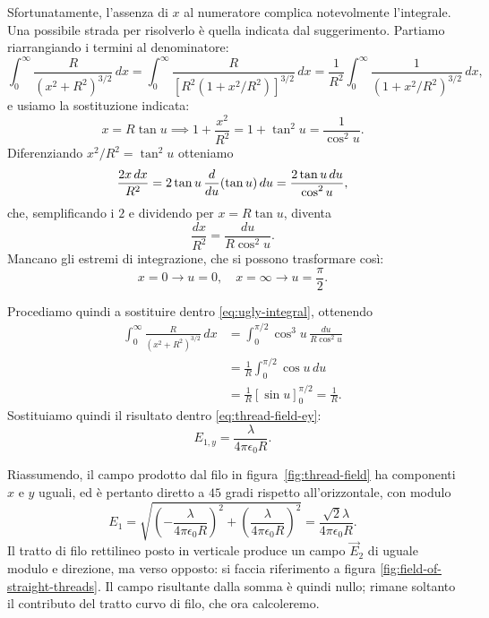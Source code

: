 \documentclass[10pt]{gulartcl}
\begin{document}
\begin{solution}
Sfortunatamente, l’assenza di $x$ al numeratore complica notevolmente
l’integrale. Una possibile strada per risolverlo è quella indicata dal
suggerimento. Partiamo riarrangiando i termini al denominatore:
\begin{equation}
    \int_{0}^{\infty} \frac{R}{(x^{2} + R^{2})^{3/2}} \, dx =
    \int_{0}^{\infty} \frac{R}{[R^2(1 + x^2 / R^2)]^{3/2}}\, dx =
    \frac{1}{R^2} \int_{0}^{\infty} \frac{1}{(1 + x^{2} / R^{2})^{3/2}}\,
    dx,
    \label{eq:ugly-integral}
\end{equation}
e usiamo la sostituzione indicata:
\begin{equation}
    x = R \tan u \implies 1 + \frac{x^{2}}{R^{2}} = 1 + \tan^2 u =
    \frac{1}{\cos^2 u}.
\end{equation}
Diferenziando $x^2 / R^2 = \tan^2 u$ otteniamo
\begin{equation}
    \frac{2 x \,dx}{R^{2}} = 2 \tan u \,\diff{}{u}(\tan u) \, du =
    \frac{2 \tan u \, du}{\cos^{2}u},
\end{equation}
che, semplificando i $2$ e dividendo per $x = R \tan u$, diventa
\begin{equation}
    \frac{dx}{R^{2}} = \frac{du}{R \cos^{2}u}.
\end{equation}
Mancano gli estremi di integrazione, che si possono trasformare così:
\begin{equation}
    x = 0 \to u = 0, \quad x = \infty \to u = \frac{\pi}{2}.
\end{equation}

Procediamo quindi a sostituire dentro \eqref{eq:ugly-integral}, ottenendo
\begin{equation}
\begin{split}
    \int_{0}^{\infty} \frac{R}{(x^{2} + R^{2})^{3/2}} \, dx 
    &= \int_{0}^{\pi/2} \cos^{3} u \, \frac{du}{R \cos^{2} u} \\
    &= \frac{1}{R} \int_{0}^{\pi/2} \cos u \, du \\
    &= \frac{1}{R} [\sin u]_{0}^{\pi/2} = \frac{1}{R}.
\end{split}
\end{equation}
Sostituiamo quindi il risultato dentro \eqref{eq:thread-field-ey}:
\begin{equation}
    E_{1, y} = \frac{\lambda}{4 \pi \epsilon_0 R}.
\end{equation}

Riassumendo, il campo prodotto dal filo in figura~\ref{fig:thread-field}
ha componenti $x$ e $y$ uguali, ed è pertanto diretto a $45$ gradi
rispetto all’orizzontale, con modulo
\begin{equation}
    E_1 = \sqrt{\left(-\frac{\lambda}{4\pi\epsilon_0
    R}\right)^{2} + \left(\frac{\lambda}{4\pi\epsilon_0 R}\right)^{2}} =
    \frac{\sqrt{2} \lambda}{4\pi\epsilon_0 R}.
\end{equation}
Il tratto di filo rettilineo posto in verticale produce un campo
$\vec{E}_2$ di uguale modulo e direzione, ma verso opposto: si faccia
riferimento a figura \ref{fig:field-of-straight-threads}. Il campo
risultante dalla somma è quindi nullo; rimane soltanto il contributo del
tratto curvo di filo, che ora calcoleremo.


\end{solution}
\end{document}
